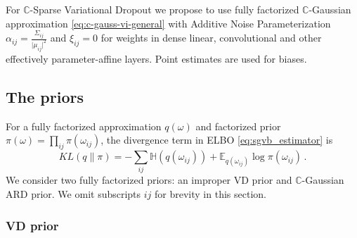 \documentclass[a4paper,10pt,twocolumn]{article}
\newcommand{\cplx}{\mathbb{C}}
\begin{document}
For $\cplx$-Sparse Variational Dropout we propose to use fully factorized $\cplx$-Gaussian
approximation \eqref{eq:c-gauss-vi-general} with Additive Noise Parameterization $
  \alpha_{ij} = \tfrac{\Sigma_{ij}}{\lvert \mu_{ij} \rvert^2}
$ and $\xi_{ij} = 0$ for weights in dense linear, convolutional and other effectively
parameter-affine layers. Point estimates are used for biases.


\subsection{The priors} %
\label{sub:the_priors}

For a fully factorized approximation $q(\omega)$ and factorized prior $
  \pi(\omega) = \prod_{ij} \pi(\omega_{ij})
$, the divergence term in ELBO \eqref{eq:sgvb_estimator} is
\begin{equation}  \label{eq:elbo-general-kl-div}
  KL(q \| \pi)
    = - \sum_{ij}
        \mathbb{H}(q(\omega_{ij}))
        + \mathbb{E}_{q(\omega_{ij})} \log{\pi(\omega_{ij})}
    \,.
\end{equation}
We consider two fully factorized priors: an improper VD prior and $\cplx$-Gaussian
ARD prior. We omit subscripts ${ij}$ for brevity in this section.

\subsubsection{VD prior} %
\label{ssub:vd_prior}
\end{document}

